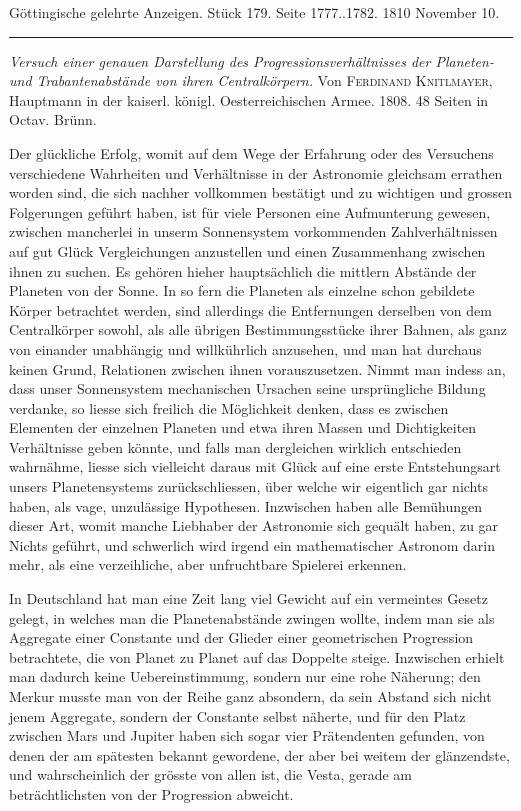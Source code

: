 \clearpage
{}
\hypertarget{native-533lower}{}\label{native-533lower}
\begin{center}\small Göttingische gelehrte Anzeigen. Stück 179. Seite 1777..1782. 1810 November 10.\\[3pt]\rule{.72\linewidth}{.3pt}\end{center}

\emph{Versuch einer genauen Darstellung des Progressionsverhältnisses der Planeten- und Trabantenabstände von ihren Centralkörpern.} Von \textsc{Ferdinand Knitlmayer}, Hauptmann in der kaiserl. königl. Oesterreichischen Armee. 1808. 48 Seiten in Octav. Brünn.

Der glückliche Erfolg, womit auf dem Wege der Erfahrung oder des Versuchens verschiedene Wahrheiten und Verhältnisse in der Astronomie gleichsam errathen worden sind, die sich nachher vollkommen bestätigt und zu wichtigen und grossen Folgerungen geführt haben, ist für viele Personen eine Aufmunterung gewesen, zwischen mancherlei in unserm Sonnensystem vorkommenden Zahlverhältnissen auf gut Glück Vergleichungen anzustellen und einen Zusammenhang zwischen ihnen zu suchen. Es gehören hieher hauptsächlich die mittlern Abstände der Planeten von der Sonne. In so fern die Planeten als einzelne schon gebildete Körper betrachtet werden, sind allerdings die Entfernungen derselben von dem Centralkörper sowohl, als alle übrigen Bestimmungsstücke ihrer Bahnen, als ganz von einander unabhängig und willkührlich anzusehen, und man hat durchaus keinen Grund, Relationen zwischen ihnen vorauszusetzen. Nimmt man indess an, dass unser Sonnensystem mechanischen Ursachen seine ursprüngliche Bildung verdanke, so liesse sich freilich die Möglichkeit denken, dass es zwischen Elementen der einzelnen Planeten und etwa ihren Massen und Dichtigkeiten Verhältnisse geben könnte, und falls man dergleichen wirklich entschieden wahrnähme, liesse sich vielleicht daraus mit Glück auf eine erste Entstehungsart unsers Planetensystems zurückschliessen, über welche wir eigentlich gar nichts haben, als vage, unzulässige Hypothesen. Inzwischen haben alle Bemühungen dieser Art, womit manche Liebhaber der Astronomie sich gequält haben, zu gar Nichts geführt, und schwerlich wird irgend ein mathematischer Astronom darin mehr, als eine verzeihliche, aber unfruchtbare Spielerei erkennen.

In Deutschland hat man eine Zeit lang viel Gewicht auf ein vermeintes Gesetz gelegt, in welches man die Planetenabstände zwingen wollte, indem man sie als Aggregate einer Constante und der Glieder einer geometrischen Progression betrachtete, die von Planet zu Planet auf das Doppelte steige. Inzwischen erhielt man dadurch keine Uebereinstimmung, sondern nur eine rohe Näherung; den Merkur musste man von der Reihe ganz absondern, da sein Abstand sich nicht jenem Aggregate, sondern der Constante selbst näherte, und für den Platz zwischen Mars und Jupiter haben sich sogar vier Prätendenten gefunden, von denen der am spätesten bekannt gewordene, der aber bei weitem der glänzendste, und wahrscheinlich der grösste von allen ist, die Vesta, gerade am beträchtlichsten von der Progression abweicht.

